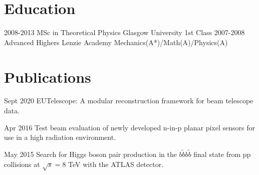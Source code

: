 \documentclass[]{twentysecondcv}
\begin{document}

\section*{Education}

\begin{twenty}
  \twentyitem
    {2008-2013}
    {MSc in Theoretical Physics }
    {Glasgow University}
    {1st Class}
  \twentyitem
    {2007-2008}
    {Advanced Highers}
    {Lenzie Academy}
    {Mechanics(A*)/Math(A)/Physics(A)}
\end{twenty}



\section*{Publications}

\begin{twentyshort}
  \twentyitemshort
    {Sept 2020}
    {EUTelescope: A modular reconstruction framework for beam telescope data.}
\end{twentyshort}

\begin{twentyshort}
  \twentyitemshort
    {Apr 2016}
    {Test beam evaluation of newly developed n-in-p planar pixel sensors for use in a high radiation environment.}
\end{twentyshort}

\begin{twentyshort}
  \twentyitemshort
    {May 2015}
    {Search for Higgs boson pair production in the $b\tilde{b}b\tilde{b}$ final state from pp collisions at $\sqrt{s}=8$ TeV with the ATLAS detector.}
\end{twentyshort}
\end{document}
